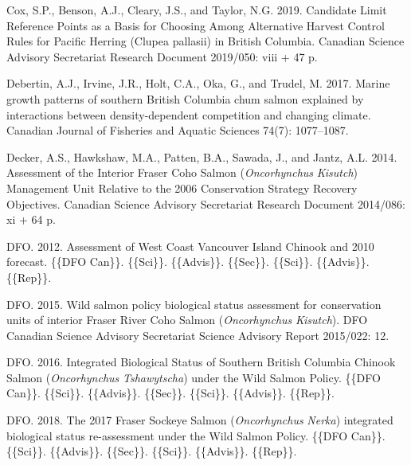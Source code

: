 \documentclass[11pt]{book}
\begin{document}
\begin{CSLReferences}{1}{0}
%
Cox, S.P., Benson, A.J., Cleary, J.S., and Taylor, N.G. 2019. Candidate {Limit Reference Points} as a {Basis} for {Choosing Among Alternative Harvest Control Rules} for {Pacific Herring} ({Clupea} pallasii) in {British Columbia}. Canadian Science Advisory Secretariat Research Document 2019/050: viii + 47 p.

%
Debertin, A.J., Irvine, J.R., Holt, C.A., Oka, G., and Trudel, M. 2017. Marine growth patterns of southern {British Columbia} chum salmon explained by interactions between density-dependent competition and changing climate. Canadian Journal of Fisheries and Aquatic Sciences 74(7): 1077--1087.

%
Decker, A.S., Hawkshaw, M.A., Patten, B.A., Sawada, J., and Jantz, A.L. 2014. Assessment of the {Interior Fraser Coho Salmon} ({\emph{Oncorhynchus}}{ \emph{Kisutch}}) {Management Unit Relative} to the 2006 {Conservation Strategy Recovery Objectives}. Canadian Science Advisory Secretariat Research Document 2014/086: xi + 64 p.

%
DFO. 2012. Assessment of {West Coast Vancouver Island Chinook} and 2010 forecast. \{\{DFO Can\}\}. \{\{Sci\}\}. \{\{Advis\}\}. \{\{Sec\}\}. \{\{Sci\}\}. \{\{Advis\}\}. \{\{Rep\}\}.

%
DFO. 2015. Wild salmon policy biological status assessment for conservation units of interior {Fraser River Coho Salmon} ({\emph{Oncorhynchus}}{ \emph{Kisutch}}). DFO Canadian Science Advisory Secretariat Science Advisory Report 2015/022: 12.

%
DFO. 2016. Integrated {Biological Status} of {Southern British Columbia Chinook Salmon} ({\emph{Oncorhynchus}}{ \emph{Tshawytscha}}) under the {Wild Salmon Policy}. \{\{DFO Can\}\}. \{\{Sci\}\}. \{\{Advis\}\}. \{\{Sec\}\}. \{\{Sci\}\}. \{\{Advis\}\}. \{\{Rep\}\}.

%
DFO. 2018. The 2017 {Fraser Sockeye Salmon} ({\emph{Oncorhynchus}}{ \emph{Nerka}}) integrated biological status re-assessment under the {Wild Salmon Policy}. \{\{DFO Can\}\}. \{\{Sci\}\}. \{\{Advis\}\}. \{\{Sec\}\}. \{\{Sci\}\}. \{\{Advis\}\}. \{\{Rep\}\}.


\end{CSLReferences}
\end{document}

